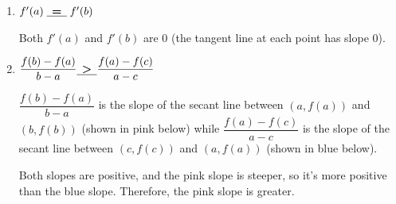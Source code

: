 \documentclass{article}
\theoremstyle{theorem}
\begin{document}
\begin{enumerate}
\begin{enumerate}
    \begin{solution}
      We can see that $f(a)$ is negative while $f(b)$ is positive. 
    \end{solution}

  \item
    \begin{problem}
      $f'(a)\;\cfitb{0.25in}{=}\;f'(b)$
    \end{problem}

    \begin{solution}
      Both $f'(a)$ and $f'(b)$ are 0 (the tangent line at each point has slope 0). 
    \end{solution}

  \item
    \begin{problem}
      $\dfrac{f(b) - f(a)}{b - a} \cfitb{0.25in}{>} \dfrac{f(a) - f(c)}{a - c}$ 
    \end{problem}

    \begin{solution}
      $\dfrac{f(b) - f(a)}{b - a}$ is the slope of the secant line between $(a, f(a))$ and $(b, f(b))$ (shown in pink below) while $\dfrac{f(a) - f(c)}{a - c}$ is the slope of the secant line between $(c, f(c))$ and $(a, f(a))$ (shown in blue below).
      \begin{center}
      \end{center}
      Both slopes are positive, and the pink slope is steeper, so it's more positive than the blue slope. Therefore, the pink slope is greater. 
    \end{solution}
  \end{enumerate}


\end{enumerate}
\end{document}
